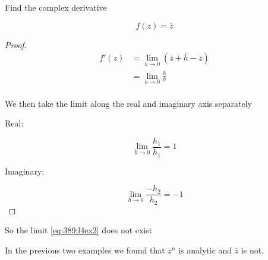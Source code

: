 \documentclass[../notes.tex]{subfiles}
\begin{document}

\begin{example}

	Find the complex derivative

	\begin{equation}
		f(z) = \overline{z}
	\end{equation}

	\begin{proof}
		
	

	\begin{equation}
		\begin{split}
			f'(z) &= \lim_{h\to0} (\overline{z} + \overline{h} - \overline{z})  \\
						&=  \lim_{h\to0} \frac{\overline{h}}{h}\\
		\end{split}
		\label{eq:389:l4ex2}
	\end{equation}

	We then take the limit along the real and imaginary axis separately

	Real:

	\begin{equation}
		\lim_{h\to0} \frac{h_1}{h_1} = 1
	\end{equation}

	Imaginary:

	\begin{equation}
		\lim_{h\to0} \frac{-h_2}{h_2} = -1
	\end{equation}
	
	\end{proof}

	So the limit \eqref{eq:389:l4ex2} does not exist
	
\end{example}


In the previous two examples we found that $ z^n $ is analytic and $ \overline{z} $ is not.
\end{document}

